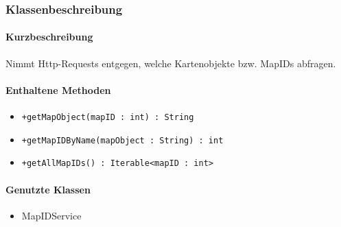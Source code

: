 \subsubsection*{Klassenbeschreibung}%
\paragraph*{Kurzbeschreibung}
Nimmt Http-Requests entgegen, welche Kartenobjekte bzw. MapIDs abfragen.
\paragraph*{Enthaltene Methoden}
\begin{itemize}
    \item \texttt{+getMapObject(mapID : int) : String}
    \item \texttt{+getMapIDByName(mapObject : String) : int}
    \item \texttt{+getAllMapIDs() : Iterable<mapID : int>}
\end{itemize}
\paragraph*{Genutzte Klassen}
\begin{itemize}
    \item MapIDService
\end{itemize}
